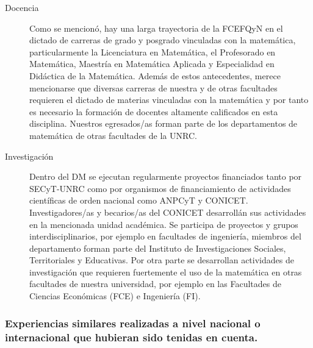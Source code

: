 \documentclass[a4paper, 12pt]{article}
\begin{document}
\begin{description}
 \item[Docencia] Como se mencionó, hay una larga trayectoria  de la FCEFQyN en el dictado de carreras de grado y posgrado  vinculadas con la matemática, particularmente la Licenciatura en Matemática, el Profesorado en Matemática, Maestría en Matemática Aplicada y Especialidad en Didáctica de la Matemática. Además de estos antecedentes, merece mencionarse que diversas carreras de nuestra y de otras facultades requieren el dictado de materias vinculadas con la matemática y por tanto es necesario la formación de docentes altamente calificados en esta disciplina. Nuestros egresados/as forman parte de los departamentos de matemática de otras facultades de la UNRC.
 
 \item[Investigación] Dentro del DM     se ejecutan regularmente  proyectos financiados tanto por SECyT-UNRC como por organismos de financiamiento de actividades científicas de orden  nacional como ANPCyT y CONICET. Investigadores/as y becarios/as del CONICET desarrollán sus actividades en la mencionada unidad académica. Se participa de proyectos y grupos interdisciplinarios, por ejemplo en  facultades de ingeniería, miembros del departamento forman parte  del Instituto de Investigaciones Sociales, Territoriales y  Educativas. Por otra parte se desarrollan actividades de investigación que requieren fuertemente el uso de la matemática en otras facultades de nuestra universidad, por ejemplo en las Facultades de Ciencias Económicas (FCE) e Ingeniería (FI).
 

 
 
\end{description}






\subsubsection{Experiencias similares realizadas a nivel nacional o internacional que hubieran sido tenidas en cuenta.}
\end{document}
